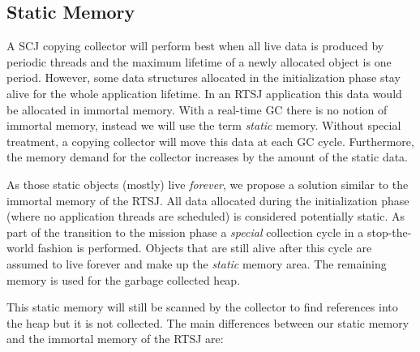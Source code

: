 \subsection{Static Memory} \label{sec:static:mem}

A SCJ copying collector will perform best when all live data is
produced by periodic threads and the maximum lifetime of a newly
allocated object is one period.  However, some data structures
allocated in the initialization phase stay alive for the whole
application lifetime.  In an RTSJ application this data would be
allocated in immortal memory.  With a real-time GC there is no notion
of {immortal} memory, instead we will use the term \emph{static}
memory. Without special treatment, a copying collector will move this
data at each GC cycle. Furthermore, the memory demand for the
collector increases by the amount of the static data.


As those static objects (mostly) live \emph{forever}, we propose a
solution similar to the immortal memory of the RTSJ. All data
allocated during the initialization phase (where no application
threads are scheduled) is considered potentially static. As part of
the transition to the mission phase a \emph{special} collection cycle
in a stop-the-world fashion is performed. Objects that are still
alive after this cycle are assumed to live forever and make up the
\emph{static} memory area. The remaining memory is used for the
garbage collected heap.


This static memory will still be scanned by the collector to find
references into the heap but it is not collected. The main
differences between our static memory and the immortal memory of the
RTSJ are:

